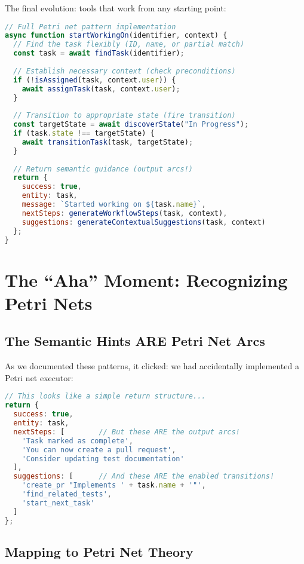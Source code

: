 \documentclass[11pt,a4paper]{article}
\begin{document}
The final evolution: tools that work from any starting point:

\begin{lstlisting}[language=JavaScript]
// Full Petri net pattern implementation
async function startWorkingOn(identifier, context) {
  // Find the task flexibly (ID, name, or partial match)
  const task = await findTask(identifier);
  
  // Establish necessary context (check preconditions)
  if (!isAssigned(task, context.user)) {
    await assignTask(task, context.user);
  }
  
  // Transition to appropriate state (fire transition)
  const targetState = await discoverState("In Progress");
  if (task.state !== targetState) {
    await transitionTask(task, targetState);
  }
  
  // Return semantic guidance (output arcs!)
  return {
    success: true,
    entity: task,
    message: `Started working on ${task.name}`,
    nextSteps: generateWorkflowSteps(task, context),
    suggestions: generateContextualSuggestions(task, context)
  };
}
\end{lstlisting}

\section{The ``Aha'' Moment: Recognizing Petri Nets}

\subsection{The Semantic Hints ARE Petri Net Arcs}

As we documented these patterns, it clicked: we had accidentally implemented a Petri net executor:

\begin{lstlisting}[language=JavaScript]
// This looks like a simple return structure...
return {
  success: true,
  entity: task,
  nextSteps: [        // But these ARE the output arcs!
    'Task marked as complete',
    'You can now create a pull request',
    'Consider updating test documentation'
  ],
  suggestions: [      // And these ARE the enabled transitions!
    'create_pr "Implements ' + task.name + '"',
    'find_related_tests',
    'start_next_task'
  ]
};
\end{lstlisting}

\subsection{Mapping to Petri Net Theory}
\end{document}
